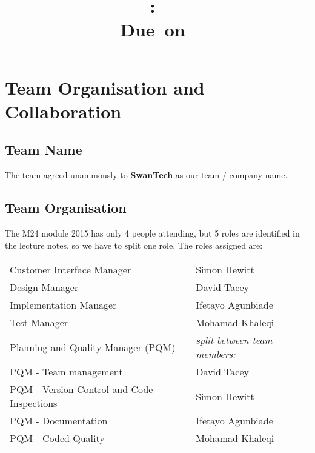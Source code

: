 \documentclass{article}
\title{
\vspace{2in}
\textmd{\textbf{\hmwkClass:\ \hmwkTitle}}\\
\normalsize\vspace{0.1in}\small{Due\ on\ \hmwkDueDate}\\
\vspace{0.1in}\large{\textit{\hmwkClassInstructor}}
\vspace{3in}
}
\author{\textbf{\hmwkAuthorName}}
\date{} %
\begin{document}
\maketitle



\newpage
\section{Team Organisation and Collaboration}
\subsection{Team Name}
The team agreed unanimously to \textbf{SwanTech} as our team / company name.
\subsection{Team Organisation}
The M24 module 2015 has only 4 people attending, but 5 roles are identified in the lecture notes, so we have to split one role. The roles assigned are:\\

\begin{tabular}{ |l|l| }   %
 \hline
 Customer Interface Manager & Simon Hewitt  \\ 
 Design Manager & David Tacey  \\ 
 Implementation Manager & Ifetayo Agunbiade  \\ 
 Test Manager & Mohamad Khaleqi \\
 Planning and Quality Manager  (PQM)& \textit{split between team members:}\\
 PQM - Team management & David Tacey\\
 PQM - Version Control and Code Inspections & Simon Hewitt\\
 PQM - Documentation & Ifetayo Agunbiade\\
 PQM - Coded Quality & Mohamad Khaleqi \\
 \hline
\end{tabular}\\
\end{document}
